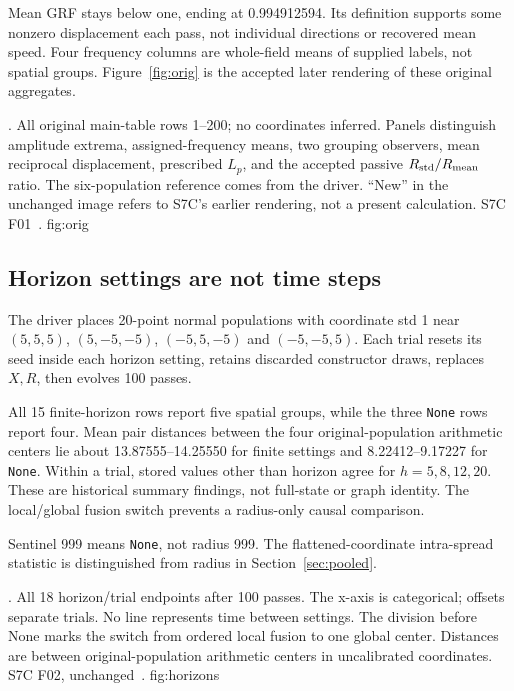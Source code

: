 Mean GRF stays below one, ending at 0.994912594. Its definition supports some nonzero displacement each pass, not individual directions or recovered mean speed. Four frequency columns are whole-field means of supplied labels, not spatial groups. Figure~\ref{fig:orig} is the accepted later rendering of these original aggregates.

{. All original main-table rows 1--200; no coordinates inferred. Panels distinguish amplitude extrema, assigned-frequency means, two grouping observers, mean reciprocal displacement, prescribed \(L_p\), and the accepted passive \(R_{\rm std}/R_{\rm mean}\) ratio. The six-population reference comes from the driver. “New” in the unchanged image refers to S7C's earlier rendering, not a present calculation. S7C F01~\citep{s7cstudy}.}
{fig:orig}

\subsection{Horizon settings are not time steps}
The driver places 20-point normal populations with coordinate std 1 near \((5,5,5)\), \((5,-5,-5)\), \((-5,5,-5)\) and \((-5,-5,5)\). Each trial resets its seed inside each horizon setting, retains discarded constructor draws, replaces \(X,R\), then evolves 100 passes.

All 15 finite-horizon rows report five spatial groups, while the three \texttt{None} rows report four. Mean pair distances between the four original-population arithmetic centers lie about 13.87555--14.25550 for finite settings and 8.22412--9.17227 for \texttt{None}. Within a trial, stored values other than horizon agree for \(h=5,8,12,20\). These are historical summary findings, not full-state or graph identity. The local/global fusion switch prevents a radius-only causal comparison.

Sentinel 999 means \texttt{None}, not radius 999. The flattened-coordinate intra-spread statistic is distinguished from radius in Section~\ref{sec:pooled}.

{. All 18 horizon/trial endpoints after 100 passes. The x-axis is categorical; offsets separate trials. No line represents time between settings. The division before None marks the switch from ordered local fusion to one global center. Distances are between original-population arithmetic centers in uncalibrated coordinates. S7C F02, unchanged~\citep{s7cstudy}.}
{fig:horizons}

